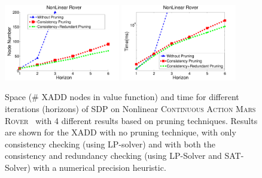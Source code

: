 \documentclass[twoside,11pt]{article}
\newcommand{\MarsRover}{\textsc{Mars Rover }}
\begin{document}
\begin{figure}[t]
\centering
\includegraphics[width=0.45\textwidth]{Figures2/camdp/contRoverNode2.pdf}
\includegraphics[width=0.45\textwidth]{Figures2/camdp/contRoverTime2.pdf}
\vspace{-3mm}
\caption{%
Space (\# XADD nodes in value function) and
time for different iterations (horizons) of SDP on Nonlinear \textsc{Continuous Action}  \MarsRover\ with 4 different results based on pruning techniques. Results are shown for  the XADD 
 with no pruning technique, with only consistency checking (using LP-solver) and with both the consistency and redundancy checking (using LP-Solver and SAT-Solver) with a numerical precision heuristic.} %
\label{fig:roverTS}
\vspace{-6mm}
\end{figure}
\end{document}
